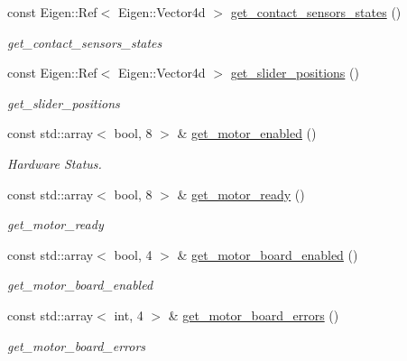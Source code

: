 \begin{DoxyCompactItemize}
const Eigen\+::\+Ref$<$ Eigen\+::\+Vector4d $>$ \hyperlink{classblmc__robots_1_1Solo8_a2a93ab10811f7425de07ccc44ec2cc07}{get\+\_\+contact\+\_\+sensors\+\_\+states} ()
\begin{DoxyCompactList}\small\item\em get\+\_\+contact\+\_\+sensors\+\_\+states \end{DoxyCompactList}\item 
const Eigen\+::\+Ref$<$ Eigen\+::\+Vector4d $>$ \hyperlink{classblmc__robots_1_1Solo8_ab63c523c0215a19f3a27fba33b4055c0}{get\+\_\+slider\+\_\+positions} ()
\begin{DoxyCompactList}\small\item\em get\+\_\+slider\+\_\+positions \end{DoxyCompactList}\item 
const std\+::array$<$ bool, 8 $>$ \& \hyperlink{classblmc__robots_1_1Solo8_a9ebe42874824fddf80f726123740a08c}{get\+\_\+motor\+\_\+enabled} ()
\begin{DoxyCompactList}\small\item\em Hardware Status. \end{DoxyCompactList}\item 
const std\+::array$<$ bool, 8 $>$ \& \hyperlink{classblmc__robots_1_1Solo8_ad4b3e743c47212fea09388e544faa418}{get\+\_\+motor\+\_\+ready} ()
\begin{DoxyCompactList}\small\item\em get\+\_\+motor\+\_\+ready \end{DoxyCompactList}\item 
const std\+::array$<$ bool, 4 $>$ \& \hyperlink{classblmc__robots_1_1Solo8_a5ed9b4edda3e20305abce34bcb1b46f2}{get\+\_\+motor\+\_\+board\+\_\+enabled} ()
\begin{DoxyCompactList}\small\item\em get\+\_\+motor\+\_\+board\+\_\+enabled \end{DoxyCompactList}\item 
const std\+::array$<$ int, 4 $>$ \& \hyperlink{classblmc__robots_1_1Solo8_aad29e62a4dbbba13f0ea80dc7631f23c}{get\+\_\+motor\+\_\+board\+\_\+errors} ()
\begin{DoxyCompactList}\small\item\em get\+\_\+motor\+\_\+board\+\_\+errors \end{DoxyCompactList}\end{DoxyCompactItemize}
